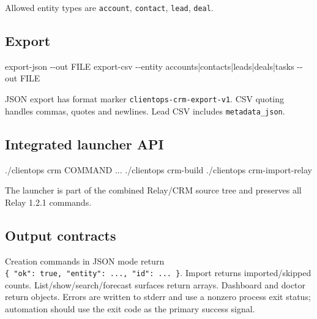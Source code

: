 \documentclass[
]{article}
\newenvironment{Shaded}{}{}
\newcommand{\NormalTok}[1]{#1}
\begin{document}
Allowed entity types are \texttt{account}, \texttt{contact},
\texttt{lead}, \texttt{deal}.

\subsection{Export}\label{export}

\begin{Shaded}
\begin{Highlighting}[]
\NormalTok{export{-}json {-}{-}out FILE}
\NormalTok{export{-}csv {-}{-}entity accounts|contacts|leads|deals|tasks {-}{-}out FILE}
\end{Highlighting}
\end{Shaded}

JSON export has format marker \texttt{clientops-crm-export-v1}. CSV
quoting handles commas, quotes and newlines. Lead CSV includes
\texttt{metadata\_json}.

\subsection{Integrated launcher API}\label{integrated-launcher-api}

\begin{Shaded}
\begin{Highlighting}[]
\NormalTok{./clientops crm COMMAND ...}
\NormalTok{./clientops crm{-}build}
\NormalTok{./clientops crm{-}import{-}relay}
\end{Highlighting}
\end{Shaded}

The launcher is part of the combined Relay/CRM source tree and preserves
all Relay 1.2.1 commands.

\subsection{Output contracts}\label{output-contracts}

Creation commands in JSON mode return
\texttt{\{\ "ok":\ true,\ "entity":\ ...,\ "id":\ ...\ \}}. Import
returns imported/skipped counts. List/show/search/forecast surfaces
return arrays. Dashboard and doctor return objects. Errors are written
to stderr and use a nonzero process exit status; automation should use
the exit code as the primary success signal.
\end{document}
